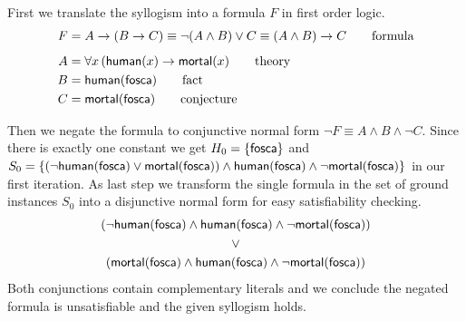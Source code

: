 \begin{example}\label{ex:syllo}
	First we translate the syllogism into a formula $F$ in first order logic.
	\begin{align*}
		F &= A \rightarrow (B \rightarrow C) \equiv \lnot(A\land B) \lor C \equiv (A\land B)\rightarrow C  
		\tag*{formula}
		\\[0.5em]
		A &= \forall x\, ( \mathsf{human}(x) \rightarrow \mathsf{mortal}(x) 
		\tag*{theory}
		\\
		B &= \mathsf{human}(\mathsf{fosca}) 
		\tag*{fact}
		\\
		C &= \mathsf{mortal}(\mathsf{fosca})
		\tag*{conjecture}
	\end{align*}
 


	Then we negate the formula to conjunctive normal form $\lnot F \equiv A\land B \land\lnot C$.
	Since there is exactly one constant we get
	$H_0 = \{ \mathsf{fosca} \}$ and 
	$S_0 = 
	\{
	(\lnot\mathsf{human}(\mathsf{fosca})\lor\mathsf{mortal}(\mathsf{fosca}))\land\mathsf{human}(\mathsf{fosca})\land\lnot\mathsf{mortal}(\mathsf{fosca})
	\}$ in our first iteration. 
	As last step we transform the single formula in 
	the set of ground instances $S_0$ into a disjunctive normal form 
	for easy satisfiability checking.
%
\begin{gather*}
(\lnot\mathsf{human}(\mathsf{fosca})\land\mathsf{human}(\mathsf{fosca})\land\lnot\mathsf{mortal}(\mathsf{fosca}))
\\ 
\lor
\\ 
(\mathsf{mortal}(\mathsf{fosca})\land\mathsf{human}(\mathsf{fosca})\land\lnot\mathsf{mortal}(\mathsf{fosca}))
\end{gather*}
Both conjunctions contain complementary literals and we conclude the negated formula is unsatisfiable
 and the given syllogism holds.
 
\end{example}


